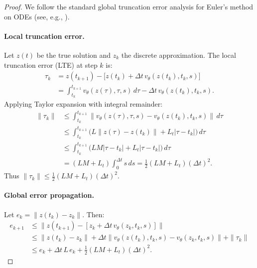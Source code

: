 \documentclass[letterpaper]{article}
\begin{document}
\begin{proof}
We follow the standard global truncation error analysis for Euler's method
on ODEs (see, e.g., \cite{atkinson2009numerical}).

\paragraph{Local truncation error.}
Let $z(t)$ be the true solution and $z_k$ the discrete approximation.
The local truncation error (LTE) at step $k$ is:
\begin{align}
    \tau_k &= z(t_{k+1}) - \bigl[ z(t_k) + \Delta t \, v_\theta(z(t_k), t_k, s) \bigr] \\
    &= \int_{t_k}^{t_{k+1}} v_\theta(z(\tau), \tau, s) \, d\tau
        - \Delta t \, v_\theta(z(t_k), t_k, s) .
\end{align}
Applying Taylor expansion with integral remainder:
\begin{align}
    \|\tau_k\| &\leq \int_{t_k}^{t_{k+1}} \bigl\| v_\theta(z(\tau), \tau, s) - v_\theta(z(t_k), t_k, s) \bigr\| \, d\tau \\
    &\leq \int_{t_k}^{t_{k+1}} \bigl( L \|z(\tau) - z(t_k)\| + L_t |\tau - t_k| \bigr) \, d\tau \\
    &\leq \int_{t_k}^{t_{k+1}} \bigl( L M |\tau - t_k| + L_t |\tau - t_k| \bigr) \, d\tau \\
    &= (L M + L_t) \int_0^{\Delta t} s \, ds = \frac{1}{2} (L M + L_t) (\Delta t)^2 .
\end{align}
Thus $\|\tau_k\| \leq \frac{1}{2} (L M + L_t) (\Delta t)^2$.

\paragraph{Global error propagation.}
Let $e_k = \|z(t_k) - z_k\|$. Then:
\begin{align}
    e_{k+1} &\leq \|z(t_{k+1}) - [z_k + \Delta t \, v_\theta(z_k, t_k, s)]\| \\
    &\leq \|z(t_k) - z_k\| + \Delta t \|v_\theta(z(t_k), t_k, s) - v_\theta(z_k, t_k, s)\| + \|\tau_k\| \\
    &\leq e_k + \Delta t \, L \, e_k + \frac{1}{2} (L M + L_t) (\Delta t)^2 .
\end{align}


\end{proof}
\end{document}
